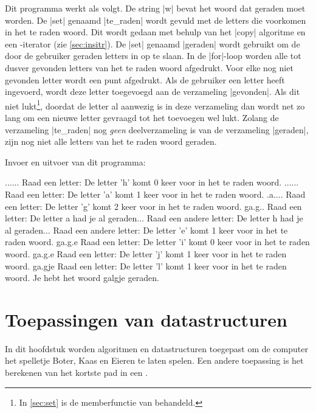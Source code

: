 \begin{cpplstShortInline}
Dit programma werkt als volgt.
De string |w| bevat het woord dat geraden moet worden.
De |set| genaamd |te_raden| wordt gevuld met de letters die voorkomen in het te raden woord.
Dit wordt gedaan met behulp van het |copy| algoritme en een \hyp{}iterator (zie \cref{sec:insitr}).
De |set| genaamd |geraden| wordt gebruikt om de door de gebruiker geraden letters in op te slaan.
In de |for|\hyp{}loop worden alle tot dusver gevonden letters van het te raden woord afgedrukt.
Voor elke nog niet gevonden letter wordt een punt afgedrukt.
Als de gebruiker een letter heeft ingevoerd, wordt deze letter toegevoegd aan de verzameling |gevonden|.
Als dit niet lukt\footnote{%
	In \cref{sec:set} is de  memberfunctie van  behandeld.
}, doordat de letter al aanwezig is in deze verzameling dan 
wordt net zo lang om een nieuwe letter gevraagd tot het toevoegen wel lukt.
Zolang de verzameling |te_raden| nog \emph{geen} deelverzameling is van de verzameling |geraden|, zijn nog niet alle letters van het te raden woord geraden.


Invoer en uitvoer van dit programma:
\begin{coutput}
......
Raad een letter: 
De letter 'h' komt 0 keer voor in het te raden woord.
......
Raad een letter: 
De letter 'a' komt 1 keer voor in het te raden woord.
.a....
Raad een letter: 
De letter 'g' komt 2 keer voor in het te raden woord.
ga.g..
Raad een letter: 
De letter a had je al geraden...
Raad een andere letter: 
De letter h had je al geraden...
Raad een andere letter: 
De letter 'e' komt 1 keer voor in het te raden woord.
ga.g.e
Raad een letter: 
De letter 'i' komt 0 keer voor in het te raden woord.
ga.g.e
Raad een letter: 
De letter 'j' komt 1 keer voor in het te raden woord.
ga.gje
Raad een letter: 
De letter 'l' komt 1 keer voor in het te raden woord.
Je hebt het woord galgje geraden.
\end{coutput}

\chapter{Toepassingen van datastructuren}
\label{sec:Toepassingen}
In dit hoofdstuk worden algoritmen en datastructuren toegepast om de computer het spelletje Boter, Kaas en Eieren te laten spelen.
Een andere toepassing is het berekenen van het kortste pad in een .


\end{cpplstShortInline}
